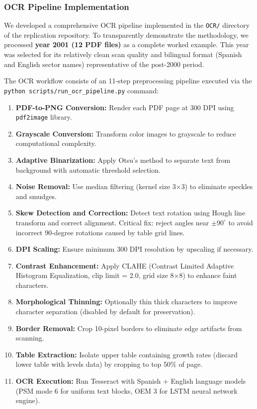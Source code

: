 \documentclass[a4paper, fleqn, 11pt]{article}
\newcommand{\pymodule}[1]{\texttt{#1}}
\newcommand{\filepath}[1]{\texttt{#1}}
\newcommand{\bashcmd}[1]{\texttt{#1}}
\begin{document}
\subsubsection{OCR Pipeline Implementation}

We developed a comprehensive OCR pipeline implemented in the \filepath{OCR/} directory of the replication repository. To transparently demonstrate the methodology, we processed \textbf{year 2001 (12 PDF files)} as a complete worked example. This year was selected for its relatively clean scan quality and bilingual format (Spanish and English sector names) representative of the post-2000 period.

\newpage
The OCR workflow consists of an 11-step preprocessing pipeline executed via the \bashcmd{python scripts/run\_ocr\_pipeline.py} command:
%
\begin{enumerate}
    \item \textbf{PDF-to-PNG Conversion:} Render each PDF page at 300 DPI using \pymodule{pdf2image} library.
    \item \textbf{Grayscale Conversion:} Transform color images to grayscale to reduce computational complexity.
    \item \textbf{Adaptive Binarization:} Apply Otsu's method to separate text from background with automatic threshold selection.
    \item \textbf{Noise Removal:} Use median filtering (kernel size 3$\times$3) to eliminate speckles and smudges.
    \item \textbf{Skew Detection and Correction:} Detect text rotation using Hough line transform and correct alignment. Critical fix: reject angles near $\pm90^\circ$ to avoid incorrect 90-degree rotations caused by table grid lines.
    \item \textbf{DPI Scaling:} Ensure minimum 300 DPI resolution by upscaling if necessary.
    \item \textbf{Contrast Enhancement:} Apply CLAHE (Contrast Limited Adaptive Histogram Equalization, clip limit = 2.0, grid size 8$\times$8) to enhance faint characters.
    \item \textbf{Morphological Thinning:} Optionally thin thick characters to improve character separation (disabled by default for preservation).
    \item \textbf{Border Removal:} Crop 10-pixel borders to eliminate edge artifacts from scanning.
    \item \textbf{Table Extraction:} Isolate upper table containing growth rates (discard lower table with levels data) by cropping to top 50\% of page.
    \item \textbf{OCR Execution:} Run Tesseract with Spanish + English language models (PSM mode 6 for uniform text blocks, OEM 3 for LSTM neural network engine).
\end{enumerate}
\end{document}
